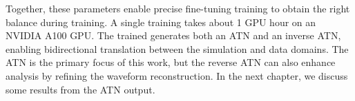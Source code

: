 Together, these parameters enable precise fine-tuning {\cpunet} training to obtain the right balance during training. A single training takes about 1 GPU hour on an NVIDIA A100 GPU. The trained {\cpunet} generates both an ATN and an inverse ATN, enabling bidirectional translation between the simulation and data domains. The ATN is the primary focus of this work, but the reverse ATN can also enhance analysis by refining the waveform reconstruction. In the next chapter, we discuss some results from the ATN output.